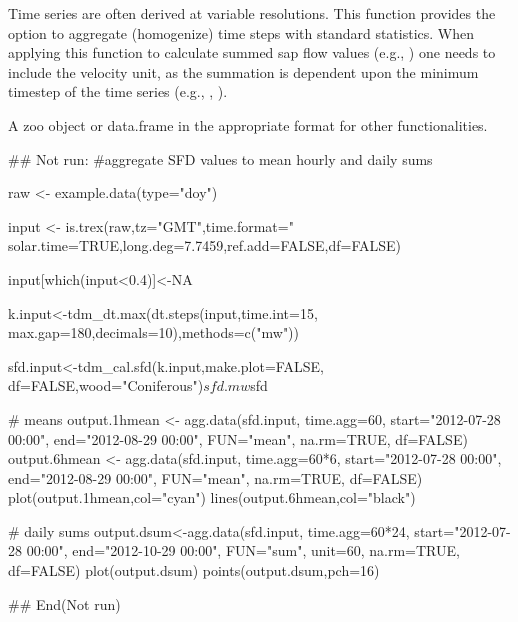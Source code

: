 \documentclass[a4paper]{book}
\begin{document}
%
\begin{Details}\relax
Time series are often derived at variable resolutions.
This function provides the option to aggregate (homogenize) time steps with
standard  statistics. When applying this function to calculate
summed sap flow values (e.g., ) one needs
to include the velocity unit, as the summation is dependent upon the minimum timestep
of the time series (e.g., , ).
\end{Details}
%
\begin{Value}
A zoo object or data.frame in the appropriate format for other functionalities.
\end{Value}
%
\begin{Examples}
\begin{ExampleCode}
## Not run: 
#aggregate SFD values to mean hourly and daily sums

raw   <- example.data(type="doy")

input <- is.trex(raw,tz="GMT",time.format="%
                  solar.time=TRUE,long.deg=7.7459,ref.add=FALSE,df=FALSE)

input[which(input<0.4)]<-NA

k.input<-tdm_dt.max(dt.steps(input,time.int=15,
               max.gap=180,decimals=10),methods=c("mw"))

sfd.input<-tdm_cal.sfd(k.input,make.plot=FALSE,
                  df=FALSE,wood="Coniferous")$sfd.mw$sfd

# means
output.1hmean <- agg.data(sfd.input,
                       time.agg=60,
                       start="2012-07-28 00:00",
                       end="2012-08-29 00:00",
                       FUN="mean",
                       na.rm=TRUE,
                       df=FALSE)
output.6hmean <- agg.data(sfd.input,
                         time.agg=60*6,
                         start="2012-07-28 00:00",
                         end="2012-08-29 00:00",
                         FUN="mean",
                         na.rm=TRUE,
                         df=FALSE)
plot(output.1hmean,col="cyan")
lines(output.6hmean,col="black")

# daily sums
output.dsum<-agg.data(sfd.input,
                      time.agg=60*24,
                      start="2012-07-28 00:00",
                      end="2012-10-29 00:00",
                      FUN="sum",
                      unit=60,
                      na.rm=TRUE,
                      df=FALSE)
plot(output.dsum)
points(output.dsum,pch=16)

## End(Not run)
\end{ExampleCode}
\end{Examples}
\end{document}
